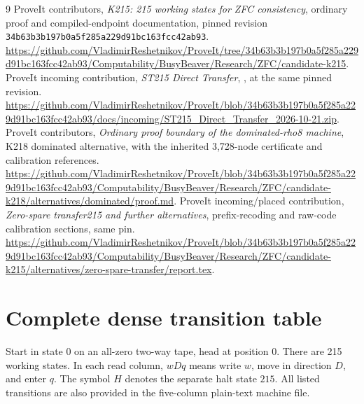 \documentclass[10pt,a4paper]{article}
\newcommand{\file}[1]{\path{#1}}
\begin{document}
\begin{thebibliography}{9}
ProveIt contributors, \emph{K215: 215 working states for ZFC consistency},
ordinary proof and compiled-endpoint documentation, pinned revision
\texttt{34b63b3b197b0a5f285a229d91bc163fcc42ab93}.
\url{https://github.com/VladimirReshetnikov/ProveIt/tree/34b63b3b197b0a5f285a229d91bc163fcc42ab93/Computability/BusyBeaver/Research/ZFC/candidate-k215}.
ProveIt incoming contribution, \emph{ST215 Direct Transfer},
\file{ST215_Direct_Transfer_2026-10-21.zip}, at the same pinned revision.
\url{https://github.com/VladimirReshetnikov/ProveIt/blob/34b63b3b197b0a5f285a229d91bc163fcc42ab93/docs/incoming/ST215_Direct_Transfer_2026-10-21.zip}.
ProveIt contributors, \emph{Ordinary proof boundary of the dominated-rho8
machine}, K218 dominated alternative, with the inherited 3,728-node
certificate and calibration references.
\url{https://github.com/VladimirReshetnikov/ProveIt/blob/34b63b3b197b0a5f285a229d91bc163fcc42ab93/Computability/BusyBeaver/Research/ZFC/candidate-k218/alternatives/dominated/proof.md}.
ProveIt incoming/placed contribution, \emph{Zero-spare transfer215 and further
alternatives}, prefix-recoding and raw-code calibration sections, same pin.
\url{https://github.com/VladimirReshetnikov/ProveIt/blob/34b63b3b197b0a5f285a229d91bc163fcc42ab93/Computability/BusyBeaver/Research/ZFC/candidate-k215/alternatives/zero-spare-transfer/report.tex}.
\end{thebibliography}

\clearpage
\appendix
\section{Complete dense transition table}
\label{app:table}

Start in state $0$ on an all-zero two-way tape, head at position $0$.
There are 215 working states.  In each read column, $wDq$ means write $w$,
move in direction $D$, and enter $q$.  The symbol $H$ denotes the separate
halt state $215$.  All listed transitions are also provided in the
five-column plain-text machine file.


\end{document}
